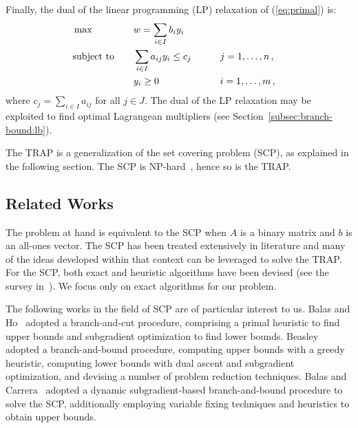 \documentclass[runningheads]{llncs}
\begin{document}
Finally, the dual of the linear programming (LP) relaxation of (\ref{eq:primal}) is:
\begin{alignat}{3}
  &\max & \quad & w = \sum_{i \in I} b_i y_i \label{eq:dual}\\
  &\text{subject to}  &       & \sum_{i \in I} a_{ij} y_i \le c_j & \qquad & j = 1,\dots,n \, , \notag\\
  &                   &       & y_i \ge 0  &\qquad& i = 1,\dots,m \, , \notag
\end{alignat}
where $c_j = \sum_{i \in I} a_{ij}$ for all $j \in J$. The dual of the LP relaxation may be exploited to find optimal Lagrangean multipliers (see Section~\ref{subsec:branch-bound:lb}).

The TRAP is a generalization of the set covering problem (SCP), as explained in the following section. The SCP is NP-hard~\cite{caprara-2000-algorithms}, hence so is the TRAP.

\subsection{Related Works}
\label{subsec:problem:related_works}

The problem at hand is equivalent to the SCP when $A$ is a binary matrix and $b$ is an all-ones vector. The SCP has been treated extensively in literature and many of the ideas developed within that context can be leveraged to solve the TRAP. For the SCP, both exact and heuristic algorithms have been devised (see the survey in~\cite{caprara-2000-algorithms}). We focus only on exact algorithms for our problem. 


The following works in the field of SCP are of particular interest to us. Balas and Ho~\cite{balas-ho-2009-set-covering} adopted a branch-and-cut procedure, comprising a primal heuristic to find upper bounds and subgradient optimization to find lower bounds.
Beasley~\cite{beasley-1987-algorithm} adopted a branch-and-bound procedure, computing upper bounds with a greedy heuristic, computing lower bounds with dual ascent and subgradient optimization, and devising a number of problem reduction techniques.
Balas and Carrera~\cite{balas-carrera-1996-dynamic} adopted a dynamic subgradient-based branch-and-bound procedure to solve the SCP, additionally employing variable fixing techniques and heuristics to obtain upper bounds.
\end{document}

